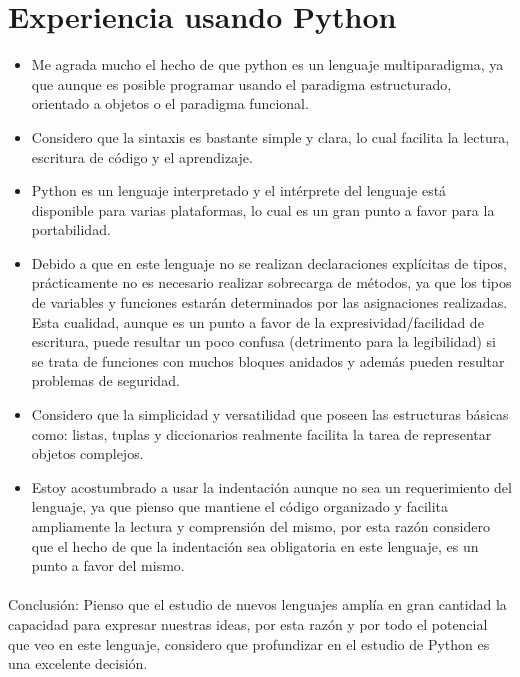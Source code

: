 \documentclass[../main.tex]{subfiles}
\begin{document}
\section{Experiencia usando Python}
\begin{itemize} 
\item Me agrada mucho el hecho de que python es un lenguaje multiparadigma, ya que aunque es posible programar usando el paradigma estructurado, orientado a objetos o el paradigma funcional.
\item Considero que la sintaxis es bastante simple y clara, lo cual facilita la lectura, escritura de código y el aprendizaje.
\item Python es un lenguaje interpretado y el intérprete del lenguaje está disponible para varias plataformas, lo cual es un gran punto a favor para la portabilidad.
\item Debido a que en este lenguaje no se realizan declaraciones explícitas de tipos, pr\'acticamente no es necesario realizar sobrecarga de m\'etodos, ya que los tipos de variables y funciones estar\'an determinados por las asignaciones realizadas. Esta cualidad, aunque es un punto a favor de la expresividad/facilidad de escritura, puede resultar un poco confusa (detrimento para la legibilidad) si se trata de funciones con muchos bloques anidados y adem\'as pueden resultar problemas de seguridad.
\item Considero que la simplicidad y versatilidad que poseen las estructuras b\'asicas como: listas, tuplas y diccionarios realmente facilita la tarea de representar objetos complejos.
\item Estoy acostumbrado a usar la indentaci\'on aunque no sea un requerimiento del lenguaje, ya que pienso que mantiene el c\'odigo organizado y facilita ampliamente la lectura y comprensión del mismo, por esta razón considero que el hecho de que la indentación sea obligatoria en este lenguaje, es un punto a favor del mismo.
\end{itemize}
\paragraph{ }
Conclusión: Pienso que el estudio de nuevos lenguajes amplía en gran cantidad la capacidad para expresar nuestras ideas, por esta razón y por todo el potencial que veo en este lenguaje, considero que profundizar en el estudio de Python es una excelente decisión.
\end{document}
